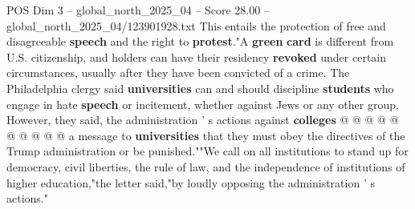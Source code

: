\begin{textsample}{POS Dim 3 – global\_north\_2025\_04 – Score 28.00 – global\_north\_2025\_04/123901928.txt}
This entails the protection of free and disagreeable \textbf{speech} and the right to \textbf{protest}."A \textbf{green} \textbf{card} is different from U.S. citizenship, and holders can have their residency \textbf{revoked} under certain circumstances, usually after they have been convicted of a crime.
The Philadelphia clergy said \textbf{universities} can and should discipline \textbf{students} who engage in hate \textbf{speech} or incitement, whether against Jews or any other group.
However, they said, the administration ' s actions against \textbf{colleges} @ @ @ @ @ @ @ @ @ @ a message to \textbf{universities} that they must obey the directives of the Trump administration or be punished.""We call on all institutions to stand up for democracy, civil liberties, the rule of law, and the independence of institutions of higher education,"the letter said,"by loudly opposing the administration ' s actions."

\end{textsample}
